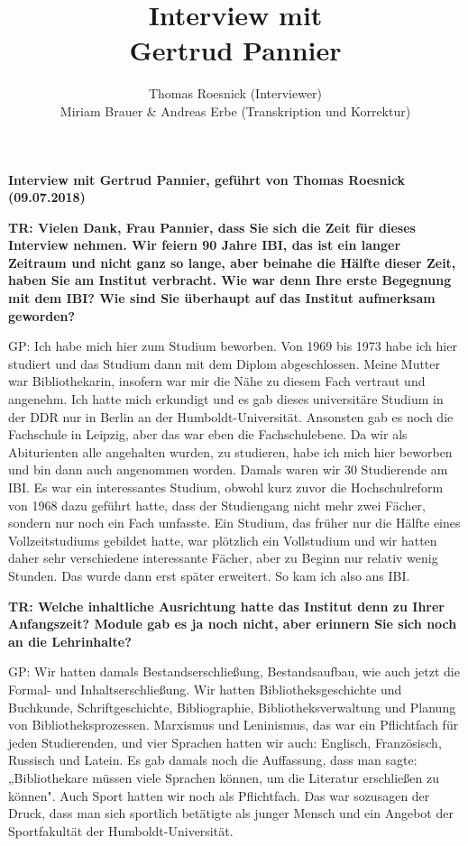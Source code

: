 \documentclass[a4paper,
fontsize=11pt,
oneside,
numbers=noperiodatend,
parskip=half-,
bibliography=totoc,
final
]{scrartcl}
\title{\LARGE{Interview mit \\ Gertrud Pannier}}%
\author{Thomas Roesnick (Interviewer) \\ Miriam Brauer \& Andreas Erbe (Transkription und Korrektur)} %
\date{}
\begin{document}
\maketitle
\thispagestyle{fancyplain} 


\textbf{{Interview mit Gertrud Pannier, geführt von Thomas Roesnick
(09.07.2018)}}

\textbf{TR: Vielen Dank, Frau Pannier, dass Sie sich die Zeit für dieses
Interview nehmen. Wir feiern 90 Jahre IBI, das ist ein langer Zeitraum
und nicht ganz so lange, aber beinahe die Hälfte dieser Zeit, haben Sie
am Institut verbracht. Wie war denn Ihre erste Begegnung mit dem IBI?
Wie sind Sie überhaupt auf das Institut aufmerksam geworden?}

GP: Ich habe mich hier zum Studium beworben. Von 1969 bis 1973 habe ich
hier studiert und das Studium dann mit dem Diplom abgeschlossen. Meine
Mutter war Bibliothekarin, insofern war mir die Nähe zu diesem Fach
vertraut und angenehm. Ich hatte mich erkundigt und es gab dieses
universitäre Studium in der DDR nur in Berlin an der
Humboldt-Universität. Ansonsten gab es noch die Fachschule in Leipzig,
aber das war eben die Fachschulebene. Da wir als Abiturienten alle
angehalten wurden, zu studieren, habe ich mich hier beworben und bin
dann auch angenommen worden. Damals waren wir 30 Studierende am IBI. Es
war ein interessantes Studium, obwohl kurz zuvor die Hochschulreform von
1968 dazu geführt hatte, dass der Studiengang nicht mehr zwei Fächer,
sondern nur noch ein Fach umfasste. Ein Studium, das früher nur die
Hälfte eines Vollzeitstudiums gebildet hatte, war plötzlich ein
Vollstudium und wir hatten daher sehr verschiedene interessante Fächer,
aber zu Beginn nur relativ wenig Stunden. Das wurde dann erst später
erweitert. So kam ich also ans IBI.

\textbf{TR: Welche inhaltliche Ausrichtung hatte das Institut denn zu
Ihrer Anfangszeit? Module gab es ja noch nicht, aber erinnern Sie sich
noch an die Lehrinhalte?}

GP: Wir hatten damals Bestandserschließung, Bestandsaufbau, wie auch
jetzt die Formal- und Inhaltserschließung. Wir hatten
Bibliotheksgeschichte und Buchkunde, Schriftgeschichte, Bibliographie,
Bibliotheksverwaltung und Planung von Bibliotheksprozessen. Marxismus
und Leninismus, das war ein Pflichtfach für jeden Studierenden, und vier
Sprachen hatten wir auch: Englisch, Französisch, Russisch und Latein. Es
gab damals noch die Auffassung, dass man sagte: „Bibliothekare müssen
viele Sprachen können, um die Literatur erschließen zu können". Auch
Sport hatten wir noch als Pflichtfach. Das war sozusagen der Druck, dass
man sich sportlich betätigte als junger Mensch und ein Angebot der
Sportfakultät der Humboldt-Universität.
\end{document}

